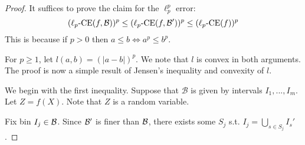 \binningLowerBound*

\begin{proof}
It suffices to prove the claim for the $\ell_p^p$ error:
\[ (\ell_p\mbox{-CE}(f, \mathcal{B}{}))^p \leq (\ell_p\mbox{-CE}(f, \mathcal{B}{}'))^p \leq (\ell_p\mbox{-CE}(f))^p \]
This is because if $p > 0$ then $a \leq b \Leftrightarrow a^p \leq b^p$.

For $p \geq 1$, let $l(a, b) = (|a - b|)^p$.
We note that $l$ is convex in both arguments.
The proof is now a simple result of Jensen's inequality and convexity of $l$.

We begin with the first inequality. Suppose that $\mathcal{B}$ is given by intervals $I_1, ..., I_m$. Let $Z = f(X)$. Note that $Z$ is a random variable.



Fix bin $I_j \in \mathcal{B}{}$.
Since $\mathcal{B}{}'$ is finer than $\mathcal{B}{}$, there exists some $S_j$ s.t. $I_j = \bigcup_{s \in S_j} I_s'$.


\end{proof}
